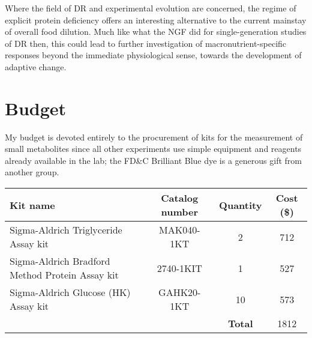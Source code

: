 \documentclass[12pt, onecolumn]{article}
\begin{document}
	Where the field of DR and experimental evolution are concerned, the regime of explicit protein deficiency offers an interesting alternative to the current mainstay of overall food dilution. Much like what the NGF did for single-generation studies of DR then, this could lead to further investigation of macronutrient-specific responses beyond the immediate physiological sense, towards the development of adaptive change.

    \section*{Budget}
	My budget is devoted entirely to the procurement of kits for the measurement of small metabolites since all other experiments use simple equipment and reagents already available in the lab; the FD\&C Brilliant Blue dye is a generous gift from another group.
	\vskip 10pt
	\begin{tabular}{l | c  c  c }
	\centering
		Kit name & Catalog number & Quantity & Cost (\$) \\
		\hline \hline
		Sigma-Aldrich Triglyceride Assay kit & MAK040-1KT & 2 & 712 \\
		Sigma-Aldrich Bradford Method Protein Assay kit & 2740-1KIT & 1 & 527 \\
		Sigma-Aldrich Glucose (HK) Assay kit & GAHK20-1KT & 10 & 573 \\
		\hline
		& & \textbf{Total} & 1812
	\end{tabular}

	\small
	\printbibliography
\end{document}
